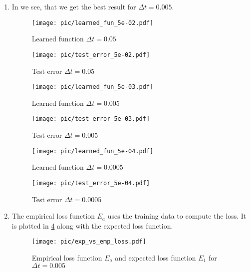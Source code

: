 \documentclass[a4paper,11pt]{scrartcl}
\newcommand*{\Dt}{\Delta{}t}
\begin{document}
\begin{enumerate}
\begin{enumerate}[leftmargin=1em]
  \item
  In  we see, that we get
  the best result for $\Dt = 0.005$.
    \begin{figure}[H]
        \begin{minipage}[b]{.5\linewidth}
          \centering
          \texttt{[image: pic/learned\_fun\_5e-02.pdf]}
          \caption{Learned function $\Dt=0.05$}
          \label{fig:learned_fun_0.05}
        \end{minipage}%
        \begin{minipage}[b]{.5\linewidth}
          \centering
          \texttt{[image: pic/test\_error\_5e-02.pdf]}
          \caption{Test error $\Dt=0.05$}
          \label{fig:test_error_0.05}
        \end{minipage}
    \end{figure}
    \begin{figure}[H]
        \begin{minipage}[b]{.5\linewidth}
          \centering
          \texttt{[image: pic/learned\_fun\_5e-03.pdf]}
          \caption{Learned function $\Dt=0.005$}
          \label{fig:learned_fun_0.005}
        \end{minipage}%
        \begin{minipage}[b]{.5\linewidth}
          \centering
          \texttt{[image: pic/test\_error\_5e-03.pdf]}
          \caption{Test error $\Dt=0.005$}
          \label{fig:test_error_0.005}
        \end{minipage}
    \end{figure}
    \begin{figure}[H]
        \begin{minipage}[b]{.5\linewidth}
          \centering
          \texttt{[image: pic/learned\_fun\_5e-04.pdf]}
          \caption{Learned function $\Dt=0.0005$}
          \label{fig:learned_fun_0.0005}
        \end{minipage}%
        \begin{minipage}[b]{.5\linewidth}
          \centering
          \texttt{[image: pic/test\_error\_5e-04.pdf]}
          \caption{Test error $\Dt=0.0005$}
          \label{fig:test_error_0.0005}
        \end{minipage}
    \end{figure}

  \item
    The empirical loss function $E_a$ uses the training data to compute the loss.
    It is plotted in \cref{fig:empirical_loss} along with the expected loss function. 
    \begin{figure}[H]
      \centering
      \texttt{[image: pic/exp\_vs\_emp\_loss.pdf]}
      \caption{Empirical loss function $E_a$ and expected loss function $E_1$
        for $\Dt = 0.005$}
      \label{fig:empirical_loss}
    \end{figure}


\end{enumerate}
\end{enumerate}
\end{document}
